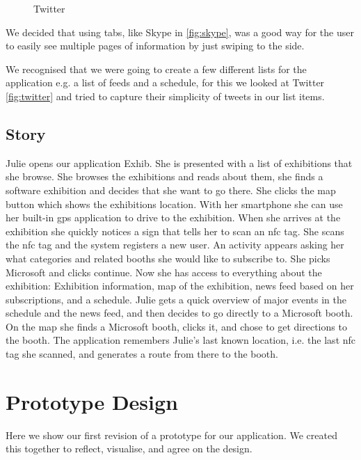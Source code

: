 \begin{figure}[H]
\begin{minipage}[b]{0.5\columnwidth}
\caption{Twitter\label{fig:twitter}}
\end{minipage}
\end{figure}

We decided that using tabs, like Skype in  \autoref{fig:skype}, was a good way for the user to easily see multiple pages of information by just swiping to the side.

We recognised that we were going to create a few different lists for the application e.g. a list of feeds and a schedule, for this we looked at Twitter \autoref{fig:twitter} and tried to capture their simplicity of tweets in our list items.

\subsection*{Story}
Julie opens our application Exhib. She is presented with a list of exhibitions that she browse. She browses the exhibitions and reads about them, she finds a software exhibition and decides that she want to go there. She clicks the map button which shows the exhibitions location. With her smartphone she can use her built-in \ac{gps} application to drive to the exhibition. When she arrives at the exhibition she quickly notices a sign that tells her to scan an \acs{nfc} tag. She scans the \acs{nfc} tag and the system registers a new user. An activity appears asking her what categories and related booths she would like to subscribe to. She picks Microsoft and clicks continue. Now she has access to everything about the exhibition: Exhibition information, map of the exhibition, news feed based on her subscriptions, and a schedule. Julie gets a quick overview of major events in the schedule and the news feed, and then decides to go directly to a Microsoft booth. On the map she finds a Microsoft booth, clicks it, and chose to get directions to the booth. The application remembers Julie's last known location, i.e. the last \acs{nfc} tag she scanned, and generates a route from there to the booth.

\section{Prototype Design}

Here we show our first revision of a prototype for our application. We created this together to reflect, visualise, and agree on the design.

